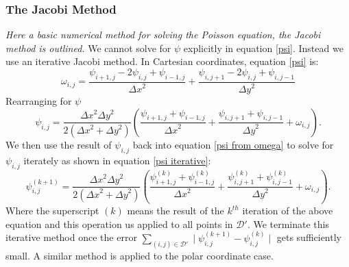 \documentclass{article}
\begin{document}
\subsubsection*{The Jacobi Method}
{\it{Here a basic numerical method for solving the Poisson equation, the Jacobi method is outlined.}}
\vspace{0.3cm}
\newline
We cannot solve for $\psi$ explicitly in equation \ref{psi}. Instead we use an iterative Jacobi method. In Cartesian coordinates, equation \ref{psi} is:
\begin{equation}
	\omega_{i,j} = \frac{\psi_{i+1,j} - 2 \psi_{i,j} + \psi_{i-1,j}  }{{\Delta x}^2} + \frac{\psi_{i,j+1} - 2 \psi_{i,j} + \psi_{i,j-1}  }{{\Delta y}^2}
	\label{psi disc}
\end{equation}
Rearranging for $\psi$
\begin{equation}
	\psi_{i,j} = \frac{{\Delta x}^2 {\Delta y}^2  }{2({\Delta x}^2  + {\Delta y}^2)} (\frac{\psi_{i+1,j} +\psi_{i-1,j} }{{\Delta x}^2} + \frac{\psi_{i,j+1} +\psi_{i,j-1}  }{{\Delta y}^2 }  + \omega_{i,j}).
	\label{psi from omega}
\end{equation}
We then use the result of $\psi_{i,j}$ back into equation \ref{psi from omega} to solve for $\psi_{i,j}$ iterately as shown in equation \ref{psi iterative}:
\begin{equation}
	\psi_{i,j}^{(k+1)} = \frac{{\Delta x}^2 {\Delta y}^2  }{2({\Delta x}^2  + {\Delta y}^2)} (\frac{\psi_{i+1,j}^{(k)} +\psi_{i-1,j}^{(k)}  }{{\Delta x}^2} + \frac{\psi_{i,j+1}^{(k)} +\psi_{i,j-1}^{(k)}  }{{\Delta y}^2 } + \omega_{i,j}).
	\label{psi iterative}
\end{equation}
Where the superscript $(k)$ means the result of the $k^{th}$ iteration of the above equation and this operation us applied to all points in $\mathcal{D}'$.
 We terminate this iterative method once the error $\sum_{(i,j) \in \mathcal{D'}} \mid \psi_{i,j}^{(k+1)} - \psi_{i,j}^{(k)} \mid$ gets sufficiently small. A similar method is applied to the polar coordinate case. 
\end{document}
